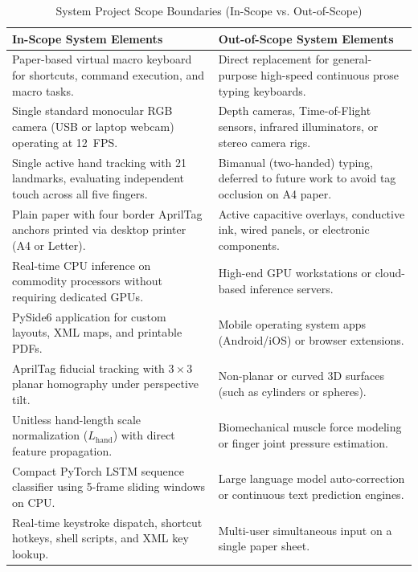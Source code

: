 \begin{table}[H]
\centering
\caption{System Project Scope Boundaries (In-Scope vs. Out-of-Scope)}
\label{tab:project_scope}
\small
\begin{tabularx}{\textwidth}{p{} p{}}
\toprule
\textbf{In-Scope System Elements} & \textbf{Out-of-Scope System Elements} \\
\midrule
Paper-based virtual macro keyboard for shortcuts, command execution, and macro tasks. & Direct replacement for general-purpose high-speed continuous prose typing keyboards. \\
\addlinespace
Single standard monocular RGB camera (USB or laptop webcam) operating at 12~FPS. & Depth cameras, Time-of-Flight sensors, infrared illuminators, or stereo camera rigs. \\
\addlinespace
Single active hand tracking with 21 landmarks, evaluating independent touch across all five fingers. & Bimanual (two-handed) typing, deferred to future work to avoid tag occlusion on A4 paper. \\
\addlinespace
Plain paper with four border AprilTag anchors printed via desktop printer (A4 or Letter). & Active capacitive overlays, conductive ink, wired panels, or electronic components. \\
\addlinespace
Real-time CPU inference on commodity processors without requiring dedicated GPUs. & High-end GPU workstations or cloud-based inference servers. \\
\addlinespace
PySide6 application for custom layouts, XML maps, and printable PDFs. & Mobile operating system apps (Android/iOS) or browser extensions. \\
\addlinespace
AprilTag fiducial tracking with $3 \times 3$ planar homography under perspective tilt. & Non-planar or curved 3D surfaces (such as cylinders or spheres). \\
\addlinespace
Unitless hand-length scale normalization ($L_{\text{hand}}$) with direct feature propagation. & Biomechanical muscle force modeling or finger joint pressure estimation. \\
\addlinespace
Compact PyTorch LSTM sequence classifier using 5-frame sliding windows on CPU. & Large language model auto-correction or continuous text prediction engines. \\
\addlinespace
Real-time keystroke dispatch, shortcut hotkeys, shell scripts, and XML key lookup. & Multi-user simultaneous input on a single paper sheet. \\
\bottomrule
\end{tabularx}
\end{table}


